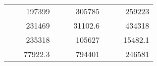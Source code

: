 \begin{table}[H]
\begin{tabular}{|ccrccrccc}
\rowcolor[HTML]{DAE8FC} 
\multicolumn{1}{|c|}{\cellcolor[HTML]{FFFFC7}}                                & \multicolumn{1}{c|}{\cellcolor[HTML]{DAE8FC}}                      & \multicolumn{1}{r|}{\cellcolor[HTML]{DAE8FC}197399}    & \multicolumn{1}{c|}{\cellcolor[HTML]{FFFFC7}}                                & \multicolumn{1}{c|}{\cellcolor[HTML]{DAE8FC}}                       & \multicolumn{1}{r|}{\cellcolor[HTML]{DAE8FC}305785}    & \multicolumn{1}{c|}{\cellcolor[HTML]{FFFFC7}}                                & \multicolumn{1}{c|}{\cellcolor[HTML]{DAE8FC}}                      & \multicolumn{1}{r|}{\cellcolor[HTML]{DAE8FC}259223}    \\ \cline{3-3} \cline{6-6} \cline{9-9} 
\multicolumn{1}{|c|}{\cellcolor[HTML]{FFFFC7}}                                & \multicolumn{1}{c|}{\cellcolor[HTML]{DAE8FC}}                      & \multicolumn{1}{r|}{\cellcolor[HTML]{DDFDFF}231469}    & \multicolumn{1}{c|}{\cellcolor[HTML]{FFFFC7}}                                & \multicolumn{1}{c|}{\cellcolor[HTML]{DAE8FC}}                       & \multicolumn{1}{r|}{\cellcolor[HTML]{DDFDFF}31102.6}   & \multicolumn{1}{c|}{\cellcolor[HTML]{FFFFC7}}                                & \multicolumn{1}{c|}{\cellcolor[HTML]{DAE8FC}}                      & \multicolumn{1}{r|}{\cellcolor[HTML]{DDFDFF}434318}    \\ \cline{3-3} \cline{6-6} \cline{9-9} 
\rowcolor[HTML]{DAE8FC} 
\multicolumn{1}{|c|}{\cellcolor[HTML]{FFFFC7}}                                & \multicolumn{1}{c|}{\cellcolor[HTML]{DAE8FC}}                      & \multicolumn{1}{r|}{\cellcolor[HTML]{DAE8FC}235318}    & \multicolumn{1}{c|}{\cellcolor[HTML]{FFFFC7}}                                & \multicolumn{1}{c|}{\cellcolor[HTML]{DAE8FC}}                       & \multicolumn{1}{r|}{\cellcolor[HTML]{DAE8FC}105627}    & \multicolumn{1}{c|}{\cellcolor[HTML]{FFFFC7}}                                & \multicolumn{1}{c|}{\cellcolor[HTML]{DAE8FC}}                      & \multicolumn{1}{r|}{\cellcolor[HTML]{DAE8FC}15482.1}   \\ \cline{3-3} \cline{6-6} \cline{9-9} 
\multicolumn{1}{|c|}{\cellcolor[HTML]{FFFFC7}}                                & \multicolumn{1}{c|}{\cellcolor[HTML]{DAE8FC}}                      & \multicolumn{1}{r|}{\cellcolor[HTML]{DDFDFF}77922.3}   & \multicolumn{1}{c|}{\cellcolor[HTML]{FFFFC7}}                                & \multicolumn{1}{c|}{\cellcolor[HTML]{DAE8FC}}                       & \multicolumn{1}{r|}{\cellcolor[HTML]{DDFDFF}794401}    & \multicolumn{1}{c|}{\cellcolor[HTML]{FFFFC7}}                                & \multicolumn{1}{c|}{\cellcolor[HTML]{DAE8FC}}                      & \multicolumn{1}{r|}{\cellcolor[HTML]{DDFDFF}246581}    \\ \cline{3-3} \cline{6-6} \cline{9-9} 

\end{tabular}
\end{table}
